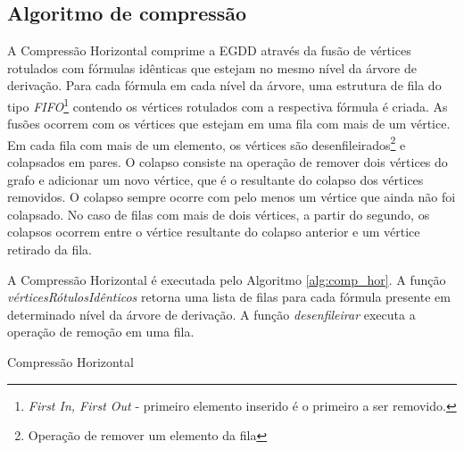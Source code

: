 \subsection{Algoritmo de compressão}

A Compressão Horizontal comprime a EGDD através da fusão de vértices rotulados com fórmulas idênticas que estejam no mesmo nível da árvore de derivação. Para cada fórmula em cada nível da árvore, uma estrutura de fila do tipo \textit{FIFO}\footnote{\textit{First In, First Out} - primeiro elemento inserido é o primeiro a ser removido.} contendo os vértices rotulados com a respectiva fórmula é criada. As fusões ocorrem com os vértices que estejam em uma fila com mais de um vértice. Em cada fila com mais de um elemento, os vértices são desenfileirados\footnote{Operação de remover um elemento da fila} e colapsados em pares. O colapso consiste na operação de remover dois vértices do grafo e adicionar um novo vértice, que é o resultante do colapso dos vértices removidos. O colapso sempre ocorre com pelo menos um vértice que ainda não foi colapsado. No caso de filas com mais de dois vértices, a partir do segundo, os colapsos ocorrem entre o vértice resultante do colapso anterior e um vértice retirado da fila. 

A Compressão Horizontal é executada pelo Algoritmo \ref{alg:comp_hor}. A função \textit{vérticesRótulosIdênticos} retorna uma lista de filas para cada fórmula presente em determinado nível da árvore de derivação. A função \textit{desenfileirar} executa a operação de remoção em uma fila.

\vspace{5mm}

\begin{algorithm}[H]
\label{alg:comp_hor}
\SetAlgoLined
{}
\caption{Compressão Horizontal}
\end{algorithm}

\vspace{5mm}

